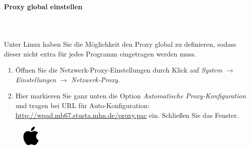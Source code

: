 \documentclass[a4paper,12pt]{scrartcl}
\begin{document}
\paragraph*{Proxy global einstellen} ~\\
\\
Unter Linux haben Sie die Möglichkeit den Proxy global zu definieren, sodass dieser nicht extra für jedes Programm eingetragen werden muss.
\begin{enumerate}
	\item Öffnen Sie die Netzwerk-Proxy-Einstellungen durch Klick auf \emph{System} $\rightarrow$ \emph{Einstellungen} $\rightarrow$ \emph{Netzwerk-Proxy}.
	\item Hier markieren Sie ganz unten die Option \emph{Automatische Proxy-Konfiguration} und tragen bei URL für Auto-Konfiguration: \url{http://wpad.mb67.stusta.mhn.de/proxy.pac} ein. Schließen Sie das Fenster. 
\end{enumerate}



\newpage
\enlargethispage{20pt}



\begin{figure}[t!]
	\raggedleft
	\vspace{-20pt}
	\includegraphics[height=1cm,keepaspectratio]{Bilder/apple_logo_neu}
	\vspace{-30pt}
\end{figure}
\end{document}
